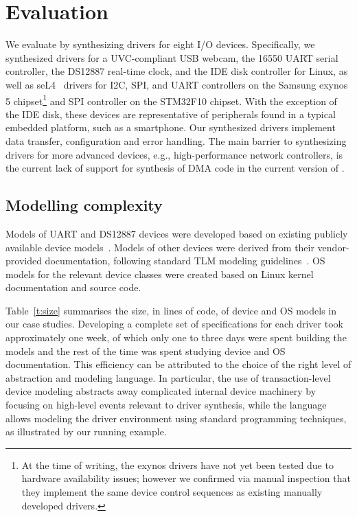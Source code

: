 \section{Evaluation}
We evaluate \termite by synthesizing drivers for eight I/O devices.  Specifically, we synthesized drivers for a UVC-compliant USB webcam, the 16550 UART serial controller, the DS12887 real-time clock, and the IDE disk controller for Linux, as well as seL4~\cite{Klein_EHACDEEKNSTW_09} drivers for I2C, SPI, and UART controllers on the Samsung exynos 5 chipset\footnote{At the time of writing, the exynos drivers have not yet been tested due to hardware availability issues; however we confirmed via manual inspection that they implement the same device control sequences as existing manually developed drivers.} and SPI controller on the STM32F10 chipset.  With the exception of the IDE disk, these devices are representative of peripherals found in a typical embedded platform, such as a smartphone.  Our synthesized drivers implement data transfer, configuration and error handling.  The main barrier to synthesizing drivers for more advanced devices, e.g., high-performance network controllers, is the current lack of support for synthesis of DMA code in the current version of \termite.  

\subsection{Modelling complexity} 
Models of UART and DS12887 devices were developed based on existing publicly available device models~\cite{ds12887, uart}.  Models of other devices were derived from their vendor-provided documentation, following standard TLM modeling guidelines~\cite{dml_ug}.  OS models for the relevant device classes were created based on Linux kernel documentation and source code.  

Table~\ref{t:size} summarises the size, in lines of code, of device and OS models in our case studies.  Developing a complete set of specifications for each driver took approximately one week, of which only one to three days were spent building the models and the rest of the time was spent studying device and OS documentation.  This efficiency can be attributed to the choice of the right level of abstraction and modeling language.  In particular, the use of transaction-level device modeling abstracts away complicated internal device machinery by focusing on high-level events relevant to driver synthesis, while the \tsl language allows modeling the driver environment using standard programming techniques, as illustrated by our running example.

